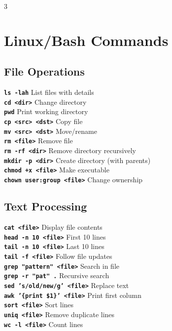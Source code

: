 \documentclass[7pt,landscape]{extarticle}
\newcommand{\cmd}[1]{\textcolor{csPrimary}{\texttt{\textbf{\fontsize{6pt}{7pt}\selectfont#1}}}}
\begin{document}
\begin{multicols*}{3}
\section*{Linux/Bash Commands}

\subsection*{File Operations}
\cmd{ls -lah} \hfill List files with details \\
\cmd{cd <dir>} \hfill Change directory \\
\cmd{pwd} \hfill Print working directory \\
\cmd{cp <src> <dst>} \hfill Copy file \\
\cmd{mv <src> <dst>} \hfill Move/rename \\
\cmd{rm <file>} \hfill Remove file \\
\cmd{rm -rf <dir>} \hfill Remove directory recursively \\
\cmd{mkdir -p <dir>} \hfill Create directory (with parents) \\
\cmd{chmod +x <file>} \hfill Make executable \\
\cmd{chown user:group <file>} \hfill Change ownership

\subsection*{Text Processing}
\cmd{cat <file>} \hfill Display file contents \\
\cmd{head -n 10 <file>} \hfill First 10 lines \\
\cmd{tail -n 10 <file>} \hfill Last 10 lines \\
\cmd{tail -f <file>} \hfill Follow file updates \\
\cmd{grep "pattern" <file>} \hfill Search in file \\
\cmd{grep -r "pat" .} \hfill Recursive search \\
\cmd{sed 's/old/new/g' <file>} \hfill Replace text \\
\cmd{awk '\{print \$1\}' <file>} \hfill Print first column \\
\cmd{sort <file>} \hfill Sort lines \\
\cmd{uniq <file>} \hfill Remove duplicate lines \\
\cmd{wc -l <file>} \hfill Count lines


\end{multicols*}
\end{document}
